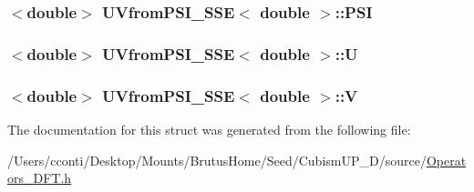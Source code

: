 \subsubsection[{P\+S\+I}]{$<$double$>$ {\bf U\+Vfrom\+P\+S\+I\+\_\+\+S\+S\+E}$<$ double $>$\+::P\+S\+I}\label{struct_u_vfrom_p_s_i___s_s_e_3_01double_01_4_a85a52a48e0761ffe50e94a48ec6c652e}
\hypertarget{struct_u_vfrom_p_s_i___s_s_e_3_01double_01_4_a4dc3dc281fa328c5b353e97610b762d8}{}
\subsubsection[{U}]{$<$double$>$ {\bf U\+Vfrom\+P\+S\+I\+\_\+\+S\+S\+E}$<$ double $>$\+::U}\label{struct_u_vfrom_p_s_i___s_s_e_3_01double_01_4_a4dc3dc281fa328c5b353e97610b762d8}
\hypertarget{struct_u_vfrom_p_s_i___s_s_e_3_01double_01_4_a7e5177ab59f35582a6782b43106ec3d8}{}
\subsubsection[{V}]{$<$double$>$ {\bf U\+Vfrom\+P\+S\+I\+\_\+\+S\+S\+E}$<$ double $>$\+::V}\label{struct_u_vfrom_p_s_i___s_s_e_3_01double_01_4_a7e5177ab59f35582a6782b43106ec3d8}


The documentation for this struct was generated from the following file\+:\begin{DoxyCompactItemize}
\item 
/\+Users/cconti/\+Desktop/\+Mounts/\+Brutus\+Home/\+Seed/\+Cubism\+U\+P\+\_\+D/source/\hyperlink{_operators___d_f_t_8h}{Operators\+\_\+\+D\+F\+T.\+h}\end{DoxyCompactItemize}
